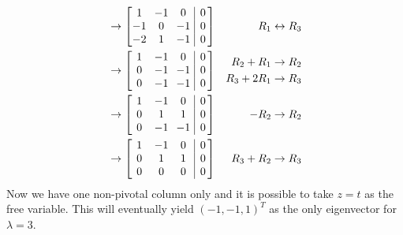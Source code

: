 \begin{solution}
\begin{align*}
&\to    
\left[\begin{array}{@{\,}wc{10pt}wc{10pt}wc{10pt}|c@{\,}}
1 & -1 & 0 & 0 \\
-1 & 0 & -1 & 0 \\
-2 & 1 & -1 & 0 
\end{array}\right] & R_1 \leftrightarrow R_3 \\
&\to    
\left[\begin{array}{@{\,}wc{10pt}wc{10pt}wc{10pt}|c@{\,}}
1 & -1 & 0 & 0 \\
0 & -1 & -1 & 0 \\
0 & -1 & -1 & 0 
\end{array}\right] & \begin{aligned}
R_2 + R_1 &\to R_2 \\
R_3 + 2R_1 &\to R_3
\end{aligned} \\
&\to    
\left[\begin{array}{@{\,}wc{10pt}wc{10pt}wc{10pt}|c@{\,}}
1 & -1 & 0 & 0 \\
0 & 1 & 1 & 0 \\
0 & -1 & -1 & 0 
\end{array}\right] & -R_2 \to R_2 \\
&\to    
\left[\begin{array}{@{\,}wc{10pt}wc{10pt}wc{10pt}|c@{\,}}
1 & -1 & 0 & 0 \\
0 & 1 & 1 & 0 \\
0 & 0 & 0 & 0 
\end{array}\right] & R_3 + R_2 \to R_3
\end{align*}
Now we have one non-pivotal column only and it is possible to take $z=t$ as the free variable. This will eventually yield $(-1,-1,1)^T$ as the only eigenvector for $\lambda = 3$.
\end{solution}


